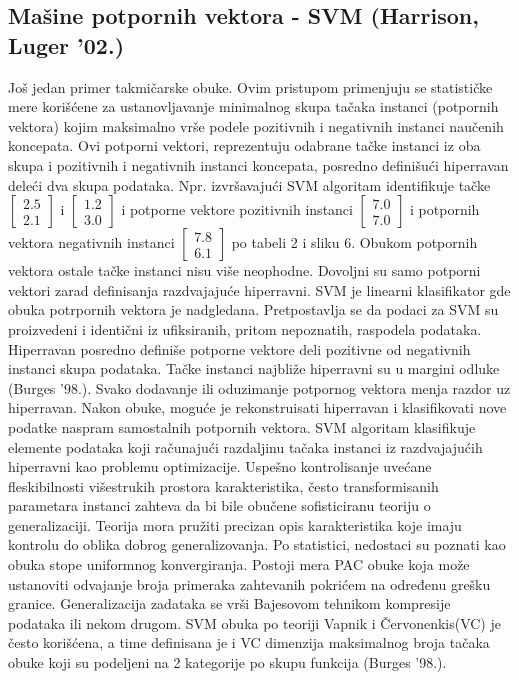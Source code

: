 \documentclass[fontsize=11bp, paper=a4]{scrarticle}
\begin{document}
\subsection{Mašine potpornih vektora - SVM (Harrison, Luger '02.)}
Još jedan primer takmičarske obuke. Ovim pristupom primenjuju se statističke mere korišćene za ustanovljavanje minimalnog skupa tačaka instanci (potpornih vektora) kojim maksimalno vrše podele pozitivnih i negativnih instanci naučenih koncepata. Ovi potporni vektori, reprezentuju odabrane tačke instanci iz oba skupa i pozitivnih i negativnih instanci koncepata, posredno definišući hiperravan deleći dva skupa podataka. Npr. izvršavajući SVM algoritam identifikuje tačke $\begin{bmatrix} 2.5 \\ 2.1 \end{bmatrix}$ i $\begin{bmatrix} 1.2 \\ 3.0 \end{bmatrix}$ i potporne vektore pozitivnih instanci $\begin{bmatrix} 7.0 \\ 7.0 \end{bmatrix}$ i potpornih vektora negativnih instanci $\begin{bmatrix} 7.8 \\ 6.1 \end{bmatrix}$ po tabeli 2 i sliku 6. Obukom potpornih vektora ostale tačke instanci nisu više neophodne. Dovoljni su samo potporni vektori zarad definisanja razdvajajuće hiperravni. SVM je linearni klasifikator gde obuka potrpornih vektora je nadgledana. Pretpostavlja se da podaci za SVM su proizvedeni i identični iz ufiksiranih, pritom nepoznatih, raspodela podataka. Hiperravan posredno definiše potporne vektore deli pozitivne od negativnih instanci skupa podataka. Tačke instanci najbliže hiperravni su u margini odluke (Burges '98.). Svako dodavanje ili oduzimanje potpornog vektora menja razdor uz hiperravan. Nakon obuke, moguće je rekonstruisati hiperravan i klasifikovati nove podatke naspram samostalnih potpornih vektora. SVM algoritam klasifikuje elemente podataka koji računajući razdaljinu tačaka instanci iz razdvajajućih hiperravni kao problemu optimizacije. Uspešno kontrolisanje uvećane fleskibilnosti višestrukih prostora karakteristika, često transformisanih parametara instanci zahteva da bi bile obučene sofisticiranu teoriju o generalizaciji. Teorija mora pružiti precizan opis karakteristika koje imaju kontrolu do oblika dobrog generalizovanja. Po statistici, nedostaci su poznati kao obuka stope uniformnog konvergiranja. Postoji mera PAC obuke\cite{pac} koja može ustanoviti odvajanje broja primeraka zahtevanih pokrićem na određenu grešku granice. Generalizacija zadataka se vrši Bajesovom tehnikom kompresije podataka ili nekom drugom. SVM obuka po teoriji Vapnik i Červonenkis(VC) je često korišćena, a time definisana je i VC dimenzija maksimalnog broja tačaka obuke koji su podeljeni na 2 kategorije po skupu funkcija (Burges '98.).
\end{document}
